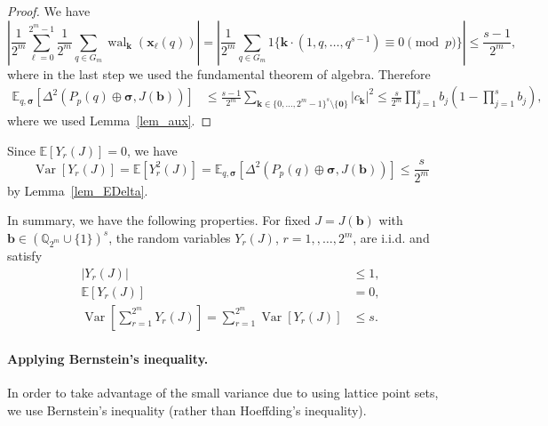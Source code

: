 \documentclass[12pt]{article}
\theoremstyle{definition}
\numberwithin{equation}{section}
\begin{document}
\begin{proof}
We have
\begin{equation*}
\left| \frac{1}{2^m} \sum_{\ell=0}^{2^m-1} \frac{1}{2^m} \sum_{q \in G_m} \operatorname{wal}_{\bm{k}}(\bm{x}_\ell(q)) \right| = \left| \frac{1}{2^m} \sum_{q \in G_m} 1\{ \bm{k} \cdot (1, q, \ldots, q^{s-1}) \equiv 0 \pmod{p} \} \right| \le \frac{s-1}{2^m},
\end{equation*}
where in the last step we used the fundamental theorem of algebra. Therefore
\begin{align*}
\mathbb{E}_{q, \bm{\sigma}}[\Delta^2(P_p(q) \oplus \bm{\sigma}, J(\bm{b}))] & \le  \frac{s-1}{2^m} \sum_{\bm{k} \in \{0, \ldots, 2^{m}-1\}^s \setminus \{\bm{0}\}}  | c_{\bm{k}} |^2   \le \frac{s}{2^m} \prod_{j=1}^s b_j  \left( 1 - \prod_{j=1}^s b_j \right),
\end{align*}
where we used  Lemma~\ref{lem_aux}.
\end{proof}


Since $\mathbb{E}[Y_r(J)] = 0$, we have
\begin{equation*}
\operatorname{Var}[Y_r(J)] = \mathbb{E}[Y_r^2(J)] = \mathbb{E}_{q, \bm{\sigma}}[\Delta^2(P_p(q) \oplus \bm{\sigma}, J(\bm{b}))] \le \frac{s}{2^m}
\end{equation*}
by Lemma~\ref{lem_EDelta}.

In summary, we have the following properties. For fixed $J=J(\bm{b})$ with $\bm{b} \in (\mathbb{Q}_{2^m} \cup \{1\})^s$, the random variables $Y_r(J)$, $r=1,,\ldots,2^m$, are i.i.d. and satisfy
\begin{equation}\label{cond_Yr}
\begin{aligned}
|Y_r(J)| & \le 1, \\ \mathbb{E}[ Y_r(J)] & = 0, %
\\ \operatorname{Var}\left[ \sum_{r=1}^{2^m} Y_r(J) \right]  = \sum_{r=1}^{2^m} \operatorname{Var}[Y_r(J)] & \le s.
\end{aligned}
\end{equation}



\paragraph{Applying Bernstein's inequality.} In order to take advantage of the small variance due to using lattice point sets, we use Bernstein's inequality \cite{ber1946} (rather than Hoeffding's inequality).
\end{document}
